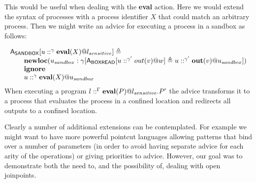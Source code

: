 \documentclass[a4paper]{llncs}
\newcommand{\Let}{{\bf let}}
\newcommand{\Letin}{{\bf in}}
\begin{document}
This would be useful when dealing with the \textbf{eval} action. Here
we would extend the syntax of processes with a process identifier $X$
that could match an arbitrary process. Then we might write an advice
for executing a process in a sandbox as follows:
\begin{comment}
$$\begin{array}{l}
{\sf SANDBOX}[u:{\bf eval}(X)@l_{sensitive}] \triangleq \\ 
\qquad {\bf ignore}\ u:{\bf eval}(
  \begin{array}[t]{l}
  \Let\ {\sf BOXREAD}[u:out(v)@w] \triangleq u:{\bf out}(v)@l_{sandbox} \\
  \Letin\ X)@l_{sandbox}
   \end{array}
\end{array}$$
When executing a program $l::{\bf eval}(P)@l_{sensitive}. P'$
the advice transforms it to
$$
l::{\bf eval}(\Let\ {\sf BOXREAD}[u:{\bf out}(v)@w] \triangleq u:{\bf out}(v)@l_{sandbox} \Letin\ P)@l_{sandbox}. P'
$$
\end{comment}
$$\begin{array}{l}
{\sf A}_{\sf SANDBOX}[u::^\gamma {\bf eval}(X)@l_{sensitive}] \triangleq \\ 
\qquad {\bf newloc}(u_{sandbox}:\gamma[{\sf A}_{\sf BOXREAD}[u::^{\gamma'} out(v)@w] 
\triangleq u::^{\gamma'} {\bf out}(v)@u_{sandbox}]) \\
\qquad {\bf ignore}\\
\qquad u ::^\gamma {\bf eval}(X)@u_{sandbox}
\end{array}$$
When executing a program $l::^\Gamma {\bf eval}(P)@l_{sensitive}. P'$
the advice transforms it to
a process 
that evaluates the process in a confined location and redirects all outputs to
a confined location.

Clearly a number of additional extensions can be contemplated. For example we
might want to have more powerful pointcut languages
\cite{avgustinov2007ssp,masuhara2003dpa} allowing patterns that bind
over a number of parameters (in order to avoid having separate advice
for each arity of the operations) or giving priorities to advice.  
However, our goal was to demonstrate both the need to, and the
possibility of, dealing with open joinpoints.
\end{document}
